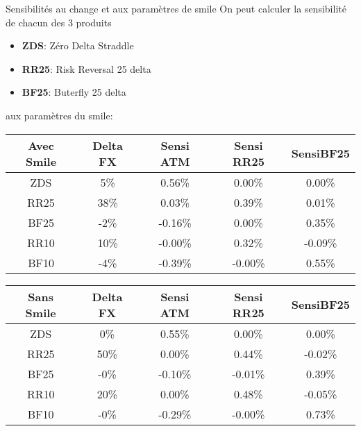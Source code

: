 \documentclass{beamer}
\begin{document}
\begin{frame}{Sensibilités au change et aux paramètres de smile}
On peut calculer la sensibilité de chacun des 3 produits 
\begin{itemize}
\item \textbf{ZDS}: Zéro Delta Straddle
\item \textbf{RR25}: Risk Reversal 25 delta
\item \textbf{BF25}: Buterfly 25 delta
\end{itemize}
aux paramètres du smile:\\
\begin{overprint}
\begin{center}
\begin{tabular}{|c|c|c|c|c|}
\hline
\textbf{Avec Smile}&\textbf{Delta FX}&\textbf{Sensi ATM}&\textbf{Sensi RR25}&\textbf{SensiBF25}\\
\hline
ZDS&5\%&0.56\%&0.00\%&0.00\%\\
RR25&38\%&0.03\%&0.39\%&0.01\%\\
BF25&-2\%&-0.16\%&0.00\%&0.35\%\\
RR10&10\%&-0.00\%&0.32\%&-0.09\%\\
BF10&-4\%&-0.39\%&-0.00\%&0.55\%\\
\hline
\end{tabular}
\end{center}
\begin{center}
\begin{tabular}{|c|c|c|c|c|}
\hline
\textbf{Sans Smile}&\textbf{Delta FX}&\textbf{Sensi ATM}&\textbf{Sensi RR25}&\textbf{SensiBF25}\\
\hline
ZDS&0\%&0.55\%&0.00\%&0.00\%\\
RR25&50\%&0.00\%&0.44\%&-0.02\%\\
BF25&-0\%&-0.10\%&-0.01\%&0.39\%\\
RR10&20\%&0.00\%&0.48\%&-0.05\%\\
BF10&-0\%&-0.29\%&-0.00\%&0.73\%\\
\hline
\end{tabular}
\end{center}
\end{overprint}
\end{frame}
\end{document}
